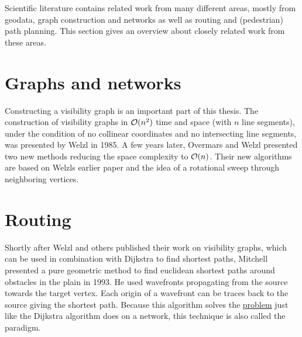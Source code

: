 
Scientific literature contains related work from many different areas, mostly from geodata, graph construction and networks as well as routing and (pedestrian) path planning.
This section gives an overview about closely related work from these areas.

\section{Graphs and networks}

	Constructing a visibility graph is an important part of this thesis.
	The construction of visibility graphs in $\mathcal{O}(n^2)$ time and space (with $n$ line segments), under the condition of no collinear coordinates and no intersecting line segments, was presented by Welzl in 1985\cite{welzl-visibility-graph}.
	A few years later, Overmars and Welzl presented two new methods reducing the space complexity to $\mathcal{O}(n)$\cite{overmars-weizl-visibility-graph}.
	Their new algorithms are based on Welzls earlier paper and the idea of a rotational sweep through neighboring vertices.
	

\section{Routing}

	Shortly after Welzl and others published their work on visibility graphs, which can be used in combination with Dijkstra to find shortest paths, Mitchell presented a pure geometric method to find euclidean shortest paths around obstacles in the plain in 1993\cite{mitchell-shortest-path}.
	He used wavefronts propagating from the source towards the target vertex.
	Each origin of a wavefront can be traces back to the source giving the shortest path.
	Because this algorithm solves the \hyperref[subsubsec:single-source-shortest-path]{ problem} just like the Dijkstra algorithm does on a network, this technique is also called the  paradigm.
	
